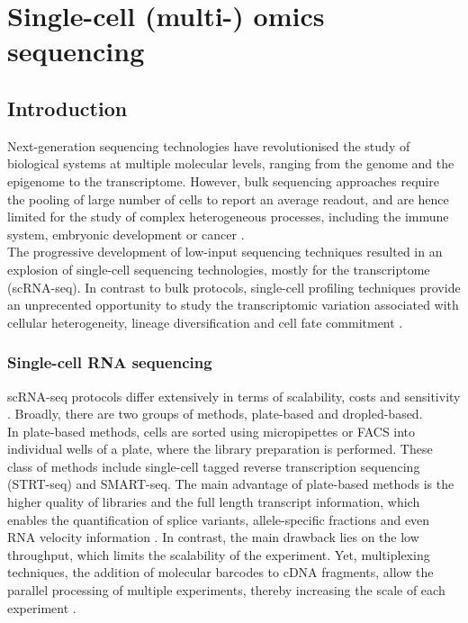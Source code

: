 \graphicspath{{Chapter1/Figs/}}

\chapter{Single-cell (multi-) omics sequencing}

\section{Introduction}
Next-generation sequencing technologies have revolutionised the study of biological systems at multiple molecular levels, ranging from the genome\cite{Fleischmann1995} and the epigenome\cite{Frommer1992} to the transcriptome\cite{Lister2008,Bainbridge2006,Nagalakshmi2008,Mortazavi2008}. However, bulk sequencing approaches require the pooling of large number of cells to report an average readout, and are hence limited for the study of complex heterogeneous processes, including the immune system, embryonic development or cancer \cite{Griffiths2018,Papalexi2018,Patel2014}.\\
The progressive development of low-input sequencing techniques resulted in an explosion of single-cell sequencing technologies, mostly for the transcriptome (scRNA-seq). In contrast to bulk protocols, single-cell profiling techniques provide an unprecented opportunity to study the transcriptomic variation associated with cellular heterogeneity, lineage diversification and cell fate commitment \cite{Kolodziejczyk2015}.

\subsection{Single-cell RNA sequencing}
scRNA-seq protocols differ extensively in terms of scalability, costs and sensitivity \cite{Svensson2018, Lafzy2018}. Broadly, there are two groups of methods, plate-based and dropled-based.\\
In plate-based methods, cells are sorted using micropipettes or FACS into individual wells of a plate, where the library preparation is performed. These class of methods include single-cell tagged reverse transcription sequencing (STRT-seq\cite{Islam2011}) and SMART-seq\cite{Ramskold2012, Picelli2014}. The main advantage of plate-based methods is the higher quality of libraries and the full length transcript information, which enables the quantification of splice variants\cite{Huang2017}, allele-specific fractions\cite{Deng2014} and even RNA velocity information \cite{LaManno2018}. In contrast, the main drawback lies on the low throughput, which limits the scalability of the experiment. Yet, multiplexing techniques, the addition of molecular barcodes to cDNA fragments, allow the parallel processing of multiple experiments, thereby increasing the scale of each experiment \cite{Hashimshony2012}. \\
	
